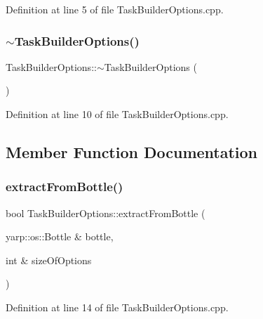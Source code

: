 Definition at line 5 of file Task\+Builder\+Options.\+cpp.

\hypertarget{classocra_1_1TaskBuilderOptions_a25342a6bc49b3d63c9e512e73ff1721c}{}\label{classocra_1_1TaskBuilderOptions_a25342a6bc49b3d63c9e512e73ff1721c} 
\subsubsection{\texorpdfstring{$\sim$\+Task\+Builder\+Options()}{~TaskBuilderOptions()}}
{\footnotesize\ttfamily Task\+Builder\+Options\+::$\sim$\+Task\+Builder\+Options (\begin{DoxyParamCaption}{ }\end{DoxyParamCaption})}



Definition at line 10 of file Task\+Builder\+Options.\+cpp.



\subsection{Member Function Documentation}
\hypertarget{classocra_1_1TaskBuilderOptions_a60271152310747f327d76d1f6557df4c}{}\label{classocra_1_1TaskBuilderOptions_a60271152310747f327d76d1f6557df4c} 
\subsubsection{\texorpdfstring{extract\+From\+Bottle()}{extractFromBottle()}}
{\footnotesize\ttfamily bool Task\+Builder\+Options\+::extract\+From\+Bottle (\begin{DoxyParamCaption}\item[{yarp\+::os\+::\+Bottle \&}]{bottle,  }\item[{int \&}]{size\+Of\+Options }\end{DoxyParamCaption})}



Definition at line 14 of file Task\+Builder\+Options.\+cpp.

